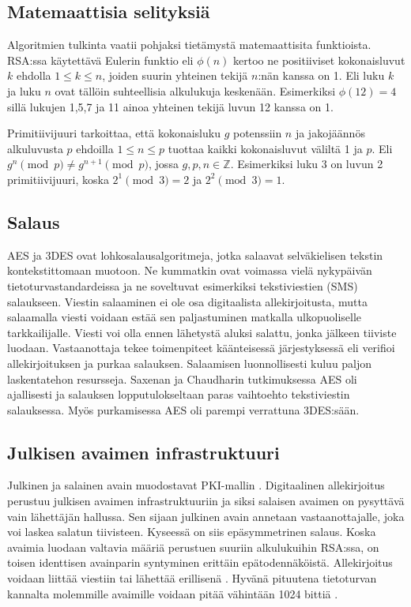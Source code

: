 \documentclass[finnish]{tktltiki2}
\theoremstyle{definition}
\theoremstyle{remark}
\begin{document}
\subsection{Matemaattisia selityksiä}

Algoritmien tulkinta vaatii pohjaksi tietämystä matemaattisita funktioista. RSA:ssa käytettävä Eulerin funktio eli $\phi(n)$ kertoo ne positiiviset kokonaisluvut $k$ ehdolla $1 \leq k \leq n$, joiden suurin yhteinen tekijä $n$:nän kanssa on 1. Eli luku $k$ ja luku $n$ ovat tällöin suhteellisia alkulukuja keskenään. Esimerkiksi $\phi(12) = 4$ sillä lukujen 1,5,7 ja 11 ainoa yhteinen tekijä luvun 12 kanssa on 1.
	
Primitiivijuuri tarkoittaa, että kokonaisluku $g$ potenssiin $n$ ja jakojäännös alkuluvusta $p$ ehdoilla $1 \leq n \leq p$ tuottaa kaikki kokonaisluvut väliltä 1 ja $p$. Eli $g^n \pmod{p} \neq g^{n+1} \pmod{p}$, jossa $g, p, n \in \mathbb{Z}$. Esimerkiksi luku 3 on luvun 2 primitiivijuuri, koska $2^1 \pmod{3} = 2$ ja $2^2 \pmod{3} = 1$. 


\subsection{Salaus} 

AES ja 3DES ovat lohkosalausalgoritmeja, jotka salaavat selväkielisen tekstin kontekstittomaan muotoon. Ne kummatkin ovat voimassa vielä nykypäivän tietoturvastandardeissa ja ne soveltuvat esimerkiksi tekstiviestien (SMS) salaukseen. Viestin salaaminen ei ole osa digitaalista allekirjoitusta, mutta salaamalla viesti voidaan estää sen paljastuminen matkalla ulkopuoliselle tarkkailijalle. Viesti voi olla ennen lähetystä aluksi salattu, jonka jälkeen tiiviste luodaan. Vastaanottaja tekee toimenpiteet käänteisessä järjestyksessä eli verifioi allekirjoituksen ja purkaa salauksen. Salaamisen luonnollisesti kuluu paljon laskentatehon resursseja. Saxenan ja Chaudharin tutkimuksessa AES oli ajallisesti ja salauksen lopputulokseltaan paras vaihtoehto tekstiviestin salauksessa. Myös purkamisessa AES oli parempi verrattuna 3DES:sään. \cite{gsm}


\subsection{Julkisen avaimen infrastruktuuri}

Julkinen ja salainen avain muodostavat PKI-mallin \cite{ECC}. Digitaalinen allekirjoitus perustuu julkisen avaimen infrastruktuuriin ja siksi salaisen avaimen on pysyttävä vain lähettäjän hallussa. Sen sijaan julkinen avain annetaan vastaanottajalle, joka voi laskea salatun tiivisteen. Kyseessä on siis epäsymmetrinen salaus. Koska avaimia luodaan valtavia määriä perustuen suuriin alkulukuihin RSA:ssa, on toisen identtisen avainparin syntyminen erittäin epätodennäköistä. Allekirjoitus voidaan liittää viestiin tai lähettää erillisenä \cite{moen}. Hyvänä pituutena tietoturvan kannalta molemmille avaimille voidaan pitää vähintään 1024 bittiä \cite{ECC}. 
\end{document}
